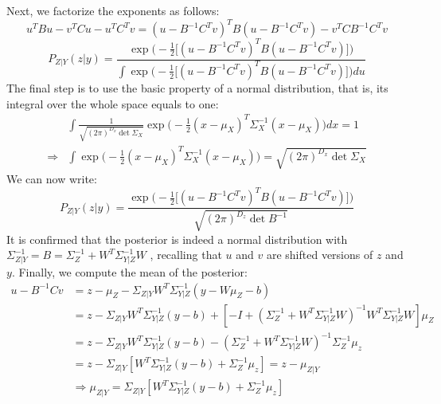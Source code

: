 \documentclass[11pt,a4paper]{article}
\begin{document}
Next, we factorize the exponents as follows:
\begin{equation}
u^TBu-v^TCu-u^TC^Tv=(u-B^{-1}C^Tv)^TB(u-B^{-1}C^Tv)-v^TCB^{-1}C^Tv
\end{equation}
\begin{equation}
P_{Z|Y}(z|y)=\frac{\exp \Big(-\frac{1}{2}\big[(u-B^{-1}C^Tv)^TB(u-B^{-1}C^Tv)\big]\Big) }{\int \exp \Big(-\frac{1}{2}\big[(u-B^{-1}C^Tv)^TB(u-B^{-1}C^Tv)\big]\Big) du}
\end{equation}
The final step is to use the basic property of a normal distribution, that is, its integral over the whole space equals to one:
\begin{equation} 
\begin{split}
&\int \frac{1}{\sqrt{(2\pi)^{D_x}\det \Sigma_{X}}}\exp \Big(-\frac{1}{2}(x-\mu_X)^T\Sigma_{X}^{-1}(x-\mu_X)\Big) dx=1\\
\Rightarrow &\int \exp \Big(-\frac{1}{2}(x-\mu_X)^T\Sigma_{X}^{-1}(x-\mu_X)\Big)=\sqrt{(2\pi)^{D_x}\det \Sigma_{X}}
\end{split}
\end{equation}
We can now write:
\begin{equation}
\boxed{P_{Z|Y}(z|y)=\frac{\exp \Big(-\frac{1}{2}\big[(u-B^{-1}C^Tv)^TB(u-B^{-1}C^Tv)\big]\Big) }{\sqrt{(2\pi)^{D_z}\det B^{-1}}} }
\end{equation}
It is confirmed that the posterior is indeed a normal distribution with\\ $\boxed{\Sigma_{Z|Y}^{-1}=B=\Sigma_{Z}^{-1}+W^T\Sigma_{Y|Z}^{-1}W}$ , recalling that $u$ and $v$ are shifted versions of $z$ and $y$. Finally, we compute the mean of the posterior:
\begin{equation} 
\begin{split}
u-B^{-1}Cv&=z-\mu_Z-\Sigma_{Z|Y}W^T\Sigma_{Y|Z}^{-1}(y-W\mu_Z-b)\\
&=z-\Sigma_{Z|Y}W^T\Sigma_{Y|Z}^{-1}(y-b)+[-I+(\Sigma_Z^{-1}+W^T\Sigma_{Y|Z}^{-1}W)^{-1}W^T\Sigma_{Y|Z}^{-1}W]\mu_Z\\
&=z-\Sigma_{Z|Y}W^T\Sigma_{Y|Z}^{-1}(y-b)-(\Sigma_Z^{-1}+W^T\Sigma_{Y|Z}^{-1}W)^{-1}\Sigma_Z^{-1}\mu_z\\
&=z-\Sigma_{Z|Y}[W^T\Sigma_{Y|Z}^{-1}(y-b)+\Sigma_Z^{-1}\mu_z]=z-\mu_{Z|Y}\\
&\Rightarrow \boxed{\mu_{Z|Y}=\Sigma_{Z|Y}[W^T\Sigma_{Y|Z}^{-1}(y-b)+\Sigma_Z^{-1}\mu_z]}
\end{split}
\end{equation}
\end{document}
